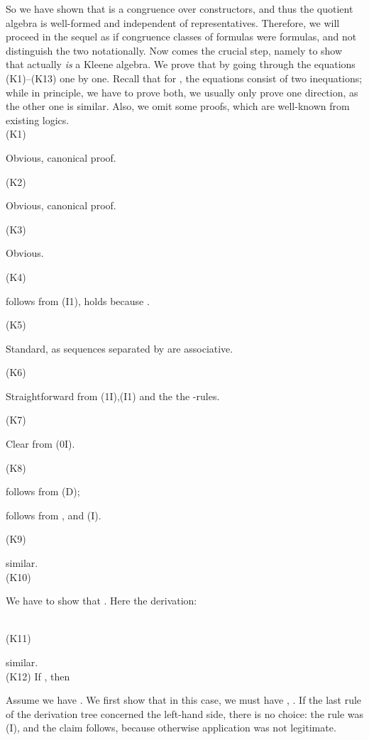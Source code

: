 \documentclass{eptcs}
\begin{document}
So we have shown that  is a congruence over constructors,
and thus the quotient algebra is well-formed and independent of
representatives. Therefore, we will proceed in the sequel as
if congruence classes of formulas were formulas, and not distinguish
the two notationally.
Now comes the crucial step, namely to show that  actually
\textit{is} a Kleene algebra. We prove that by going through
the equations (K1)--(K13) one by one. Recall that for ,
the equations consist of two inequations; while in principle, we have
to prove both, we usually 
only prove one direction, as the other one is similar.
Also, we omit some proofs, which are well-known from
existing logics.
\\

(K1) 

Obvious, canonical proof.


(K2) 

Obvious, canonical proof.

(K3) 

Obvious.

(K4) 

 follows from (I1),
 holds because 
.

(K5) 

Standard, as sequences separated by  are associative.

(K6) 

Straightforward from (1I),(I1) and the the -rules.

(K7) 

Clear from (0I).

(K8) 


follows from (D);

follows from ,
 and 
(I).

(K9) 

similar.
\\

(K10) 

We have to show that
. Here the derivation:



\\


(K11) 

similar. 
\\

(K12) If , then 

Assume we
have . 
We first show that in this case, 
we must have , .
If the last rule of the derivation tree concerned the left-hand side, there is
no choice: the rule was (I), and the claim follows,
because otherwise application was not legitimate.
\end{document}
